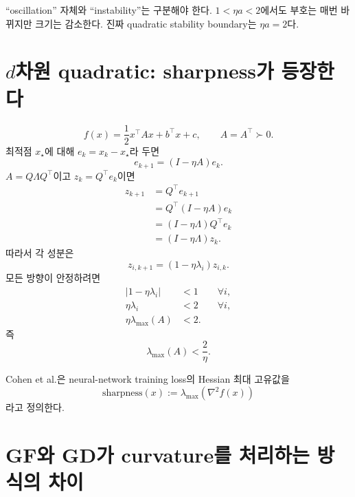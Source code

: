 \documentclass[11pt,a4paper,oneside,openany]{memoir}
\newcommand{\Hess}{\nabla^2}
\theoremstyle{definition}
\begin{document}
\begin{keybox}
``oscillation'' 자체와 ``instability''는 구분해야 한다.
$1<\eta a<2$에서도 부호는 매번 바뀌지만 크기는 감소한다.
진짜 quadratic stability boundary는 $\eta a=2$다.
\end{keybox}

\section{\texorpdfstring{$d$}{d}차원 quadratic: sharpness가 등장한다}

\begin{equation}
  f(x)=\frac12x^\top A x+b^\top x+c,
  \qquad A=A^\top\succ0.
\end{equation}
최적점 $x_\star$에 대해 $e_k=x_k-x_\star$라 두면
\begin{equation}
  e_{k+1}=(I-\eta A)e_k.
\end{equation}
$A=Q\Lambda Q^\top$이고 $z_k=Q^\top e_k$이면
\begin{align}
  z_{k+1}
  &=Q^\top e_{k+1}\\
  &=Q^\top(I-\eta A)e_k\\
  &=(I-\eta\Lambda)Q^\top e_k\\
  &=(I-\eta\Lambda)z_k.
\end{align}
따라서 각 성분은
\begin{equation}
  z_{i,k+1}=(1-\eta\lambda_i)z_{i,k}.
\end{equation}
모든 방향이 안정하려면
\begin{align}
  |1-\eta\lambda_i|&<1\qquad\forall i,\\
  \eta\lambda_i&<2\qquad\forall i,\\
  \eta\lambda_{\max}(A)&<2.
\end{align}
즉
\begin{equation}
  \boxed{\lambda_{\max}(A)<\frac{2}{\eta}.}
  \label{eq:quadratic-threshold}
\end{equation}

Cohen et al.은 neural-network training loss의 Hessian 최대 고유값을
\begin{equation}
  \text{sharpness}(x):=\lambda_{\max}(\Hess f(x))
\end{equation}
라고 정의한다.

\section{GF와 GD가 curvature를 처리하는 방식의 차이}
\end{document}
